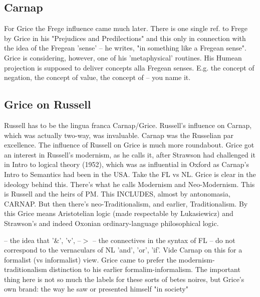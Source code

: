 \documentclass[10pt,titlepage]{book}
\begin{document}
{\subsection{Carnap}
For  Grice the Frege influence came much later. There is one single ref. 
to Frege by  Grice in his "Prejudices and Predilections" and this only in 
connection with the  idea of the Fregean 'sense' -- he writes, "in something 
like a Fregean sense".  Grice is considering, however, one of his 
'metaphysical' routines. His Humean  projection is supposed to deliver concepts alla 
Fregean senses. E.g. the concept  of negation, the concept of value, the 
concept of -- you name  it.

\subsection{Grice on Russell}

Russell has to be  the lingua franca Carnap/Grice.
Russell's influence on Carnap, 
which was  actually two-way, was invaluable. Carnap was the Russelian par 
excellence. The  influence of Russell on Grice is much more roundabout. Grice 
got an interest in  Russell's modernism, as he calls it, after Strawson had 
challenged it in Intro  to logical theory (1952), which was as influential 
in Oxford as Carnap's Intro  to Semantics had been in the USA. Take the FL   
vs   NL.  Grice is clear in the ideology behind this. There's what he calls 
Modernism and  Neo-Modernism. This is Russell and the heirs of PM. This 
INCLUDES, almost by  antonomasia, CARNAP. But then there's neo-Traditionalism, 
and earlier,  Traditionalism. By this Grice means Aristotelian logic (made 
respectable by  Lukasiewicz) and Strawson's and indeed Oxonian 
ordinary-language philosophical  logic. 

--  the idea that '\&', 'v', --$>$ -- the connectives in the syntax of FL -- 
do  not correspond to the vernaculars of NL 'and', 'or', 'if'. Vide Carnap on 
this  for a formalist (vs informalist) view. Grice came to prefer the  
modernism-traditionalism distinction to his earlier formalim-informalism. The  
important thing here is not so much the labels for these sorts of betes 
noires,  but Grice's own brand: the way he saw or presented himself "in society" 

}
\end{document}
